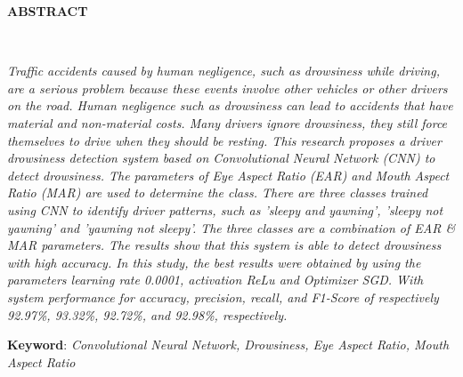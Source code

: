 \clearpage

\begin{minipage}{\textwidth}

\centering
\end{minipage}

\vspace{1em}

\normalsize \bfseries \centering \MakeUppercase{Abstract}
% 
\\[2\baselineskip]

\justifying \normalfont \normalsize

{

\textit{Traffic accidents caused by human negligence, such as drowsiness while driving, are a serious problem because these events involve other vehicles or other drivers on the road. Human negligence such as drowsiness can lead to accidents that have material and non-material costs. Many drivers ignore drowsiness, they still force themselves to drive when they should be resting. This research proposes a driver drowsiness detection system based on Convolutional Neural Network (CNN) to detect drowsiness. The parameters of Eye Aspect Ratio (EAR) and Mouth Aspect Ratio (MAR) are used to determine the class. There are three classes trained using CNN to identify driver patterns, such as 'sleepy and yawning', 'sleepy not yawning' and 'yawning not sleepy'. The three classes 
are a combination of EAR \& MAR parameters. The results show that this system is able to detect drowsiness with high accuracy. In this study, the best results were obtained by using the parameters \textit{learning rate} 0.0001, \textit{activation} ReLu and \textit{Optimizer} SGD. With system performance for accuracy, precision, recall, and F1-Score of respectively 92.97\%, 93.32\%, 92.72\%, and 92.98\%, respectively.
}

}

\textbf{Keyword}: \textit{Convolutional Neural Network, Drowsiness, Eye Aspect Ratio, Mouth
Aspect Ratio}

\clearpage
